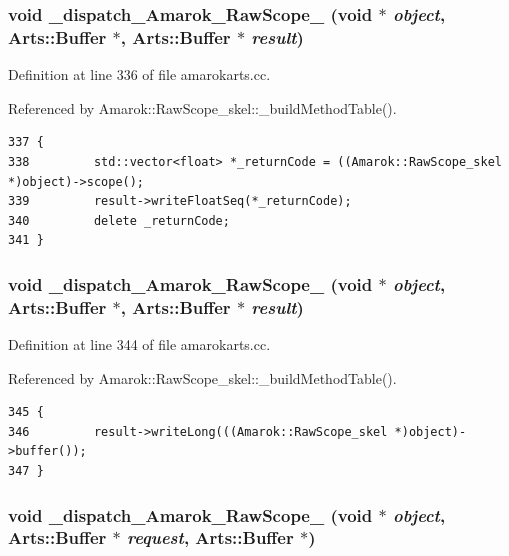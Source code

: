 \subsubsection{\setlength{\rightskip}{0pt plus 5cm}void \_\-dispatch\_\-Amarok\_\-Raw\-Scope\_ (void $\ast$ {\em object}, Arts::Buffer $\ast$, Arts::Buffer $\ast$ {\em result})\hspace{0.3cm}{\tt  [static]}}\label{amarokarts_8cc_a2}




Definition at line 336 of file amarokarts.cc.

Referenced by Amarok::Raw\-Scope\_\-skel::\_\-build\-Method\-Table().



\footnotesize\begin{verbatim}337 {
338         std::vector<float> *_returnCode = ((Amarok::RawScope_skel *)object)->scope();
339         result->writeFloatSeq(*_returnCode);
340         delete _returnCode;
341 }
\end{verbatim}\normalsize 
{}
\subsubsection{\setlength{\rightskip}{0pt plus 5cm}void \_\-dispatch\_\-Amarok\_\-Raw\-Scope\_ (void $\ast$ {\em object}, Arts::Buffer $\ast$, Arts::Buffer $\ast$ {\em result})\hspace{0.3cm}{\tt  [static]}}\label{amarokarts_8cc_a3}




Definition at line 344 of file amarokarts.cc.

Referenced by Amarok::Raw\-Scope\_\-skel::\_\-build\-Method\-Table().



\footnotesize\begin{verbatim}345 {
346         result->writeLong(((Amarok::RawScope_skel *)object)->buffer());
347 }
\end{verbatim}\normalsize 
{}
\subsubsection{\setlength{\rightskip}{0pt plus 5cm}void \_\-dispatch\_\-Amarok\_\-Raw\-Scope\_ (void $\ast$ {\em object}, Arts::Buffer $\ast$ {\em request}, Arts::Buffer $\ast$)\hspace{0.3cm}{\tt  [static]}}\label{amarokarts_8cc_a4}




